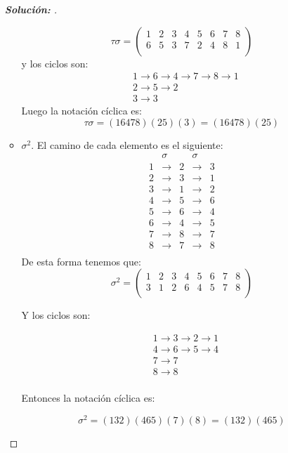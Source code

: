 \documentclass[12pt]{article}
\begin{document}
\begin{enumerate}
\begin{proof}[\textbf{Solución: }]
\begin{itemize}
$$        \tau\sigma=\begin{pmatrix}
         1 & 2 & 3 & 4 & 5 & 6 & 7 & 8\\
         6 & 5 & 3 & 7 & 2 & 4 & 8 & 1 \\
        \end{pmatrix}$$
        y los ciclos son:
        \begin{align*}
            &1\to6\to4\to7\to8\to1\\
            &2\to5\to2\\
            &3\to3
        \end{align*}
        Luego la notación cíclica es:
        $$\tau\sigma=(16478)(25)(3)=(16478)(25)$$
        \item $\sigma^2$. El camino de cada elemento es el siguiente:
        $$\begin{matrix}
              &\sigma& &\sigma& \\
            1 &\to &2&\to   &3\\
            2 &\to &3&\to   &1\\
            3 &\to &1&\to   &2\\
            4 &\to &5&\to   &6\\
            5 &\to &6&\to   &4\\
            6 &\to &4&\to   &5\\
            7 &\to &8&\to   &7\\
            8 &\to &7&\to   &8\\
        \end{matrix}$$
        De esta forma tenemos que:
        $$
        \sigma^2=\begin{pmatrix}
         1 & 2 & 3 & 4 & 5 & 6 & 7 & 8\\
         3 & 1 & 2 & 6 & 4 & 5 & 7 & 8 \\
        \end{pmatrix}$$

       Y los ciclos son:

       \begin{align*}
           &1\to3\to2\to1\\
           &4\to6\to5\to4\\
           &7\to7\\
           &8\to8\\
       \end{align*}

       Entonces la notación cíclica es:

       $$\sigma^2=(132)(465)(7)(8)=(132)(465)$$


\end{itemize}
\end{proof}
\end{enumerate}
\end{document}

